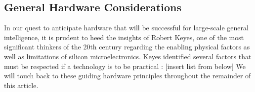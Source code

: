 \subsection{\label{sec:general_hardware_considerations}General Hardware Considerations}

In our quest to anticipate hardware that will be successful for large-scale general intelligence, it is prudent to heed the insights of Robert Keyes, one of the most significant thinkers of the 20th century regarding the enabling physical factors as well as limitations of silicon microelectronics. Keyes identified several factors that must be respected if a technology is to be practical \cite{ke1985a,ke1985b}: [insert list from below] We will touch back to these guiding hardware principles throughout the remainder of this article.

